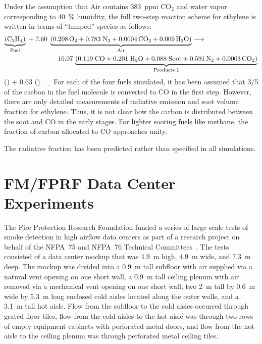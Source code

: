 Under the assumption that Air contains 383~ppm CO$_2$ and water vapor corresponding to 40~\% humidity, the full two-step reaction scheme for ethylene is written in terms of ``lumped'' species as follows:
\begin{eqnarray}
\lefteqn{ \underbrace{\mathrm{ (C_2H_4) }}_\text{Fuel} \; + \;
7.60 \; \underbrace{ \mathrm{\left( 0.208 \, O_2 + 0.783 \; N_2 + 0.0004 \, CO_2 + 0.009 \, H_2O \right)}}_\text{Air} \longrightarrow } \quad \quad \quad \quad \quad \quad \quad \nonumber \\
& & 10.07 \, \underbrace{\mathrm{(0.119 \; CO +  0.201 \; H_2O + 0.088 \; Soot +  0.591\, N_2 + 0.0003 \, CO_2)}}_\text{Products 1}
\end{eqnarray}
\be
() + 0.63 \; ()  \, _
\ee
For each of the four fuels simulated, it has been assumed that 3/5 of the carbon in the fuel molecule is converted to CO in the first step. However, there are only detailed measurements of radiative emission and soot volume fraction for ethylene. Thus, it is not clear how the carbon is distributed between the soot and CO in the early stages. For lighter sooting fuels like methane, the fraction of carbon allocated to CO approaches unity.

The radiative fraction has been predicted rather than specified in all simulations.



\section{FM/FPRF Data Center Experiments}
\label{FM_FPRF_Datacenter_Description}

The Fire Protection Research Foundation funded a series of large scale tests of smoke detection in high airflow data centers as part of a research project on behalf of the NFPA~75 and NFPA~76 Technical Committees~\cite{FM_Datacenter_Rpt}. The tests consisted of a data center mockup that was 4.9~m high, 4.9~m wide, and 7.3~m deep. The mockup was divided into a 0.9~m tall subfloor with air supplied via a natural vent opening on one short wall, a 0.9~m tall ceiling plenum with air removed via a mechanical vent opening on one short wall, two 2~m tall by 0.6~m wide by 5.3~m long enclosed cold aisles located along the outer walls, and a 3.1~m tall hot aisle.  Flow from the subfloor to the cold aisles occurred through grated floor tiles, flow from the cold aisles to the hot aisle was through two rows of empty equipment cabinets with perforated metal doors, and flow from the hot aisle to the ceiling plenum was through perforated metal ceiling tiles.

